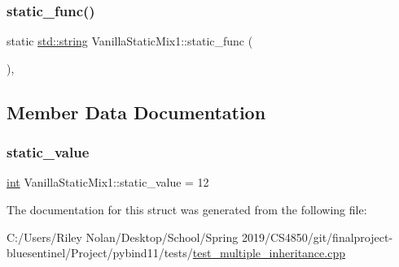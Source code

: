 \subsubsection{\texorpdfstring{static\_func()}{static\_func()}}
{\footnotesize\ttfamily static \mbox{\hyperlink{_s_d_l__opengl__glext_8h_ab4ccfaa8ab0e1afaae94dc96ef52dde1}{std\+::string}} Vanilla\+Static\+Mix1\+::static\+\_\+func (\begin{DoxyParamCaption}{ }\end{DoxyParamCaption})\hspace{0.3cm}{\ttfamily [inline]}, {\ttfamily [static]}}



\subsection{Member Data Documentation}
\mbox{\label{struct_vanilla_static_mix1_a6322ef80a86975aba922ce210d5680d4}} 
\subsubsection{\texorpdfstring{static\_value}{static\_value}}
{\footnotesize\ttfamily \mbox{\hyperlink{warnings_8h_a74f207b5aa4ba51c3a2ad59b219a423b}{int}} Vanilla\+Static\+Mix1\+::static\+\_\+value = 12\hspace{0.3cm}{\ttfamily [static]}}



The documentation for this struct was generated from the following file\+:\begin{DoxyCompactItemize}
\item 
C\+:/\+Users/\+Riley Nolan/\+Desktop/\+School/\+Spring 2019/\+C\+S4850/git/finalproject-\/bluesentinel/\+Project/pybind11/tests/\mbox{\hyperlink{test__multiple__inheritance_8cpp}{test\+\_\+multiple\+\_\+inheritance.\+cpp}}\end{DoxyCompactItemize}
